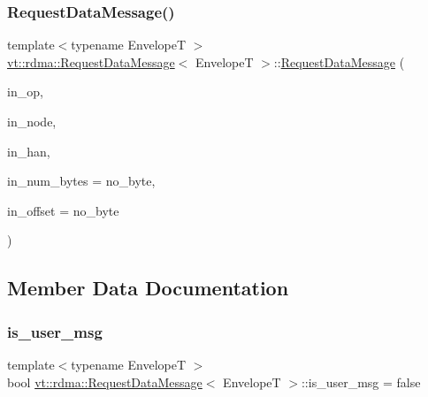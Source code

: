 \subsubsection{\texorpdfstring{Request\+Data\+Message()}{RequestDataMessage()}}
{\footnotesize\ttfamily template$<$typename EnvelopeT $>$ \\
\hyperlink{structvt_1_1rdma_1_1_request_data_message}{vt\+::rdma\+::\+Request\+Data\+Message}$<$ EnvelopeT $>$\+::\hyperlink{structvt_1_1rdma_1_1_request_data_message}{Request\+Data\+Message} (\begin{DoxyParamCaption}\item[{\hyperlink{namespacevt_1_1rdma_a9b966d9780a2b41afe7cd7b7b4b20300}{R\+D\+M\+A\+\_\+\+Op\+Type} const \&}]{in\+\_\+op,  }\item[{\hyperlink{namespacevt_a866da9d0efc19c0a1ce79e9e492f47e2}{Node\+Type} const}]{in\+\_\+node,  }\item[{\hyperlink{namespacevt_a10442579ec4e7ebef223818e64bcf908}{R\+D\+M\+A\+\_\+\+Handle\+Type} const \&}]{in\+\_\+han,  }\item[{\hyperlink{namespacevt_aab8d55968084610ce3b17057981e9300}{Byte\+Type} const \&}]{in\+\_\+num\+\_\+bytes = {\ttfamily no\+\_\+byte},  }\item[{\hyperlink{namespacevt_aab8d55968084610ce3b17057981e9300}{Byte\+Type} const \&}]{in\+\_\+offset = {\ttfamily no\+\_\+byte} }\end{DoxyParamCaption})\hspace{0.3cm}{\ttfamily [inline]}}



\subsection{Member Data Documentation}
\mbox{\label{structvt_1_1rdma_1_1_request_data_message_a1f9eeffb6869c9703bb6ad3db5ef6ef1}} 
\subsubsection{\texorpdfstring{is\+\_\+user\+\_\+msg}{is\_user\_msg}}
{\footnotesize\ttfamily template$<$typename EnvelopeT $>$ \\
bool \hyperlink{structvt_1_1rdma_1_1_request_data_message}{vt\+::rdma\+::\+Request\+Data\+Message}$<$ EnvelopeT $>$\+::is\+\_\+user\+\_\+msg = false}

